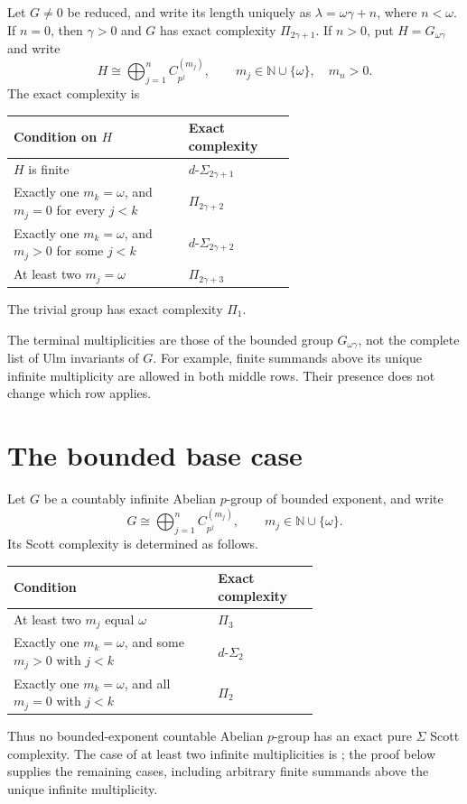 \documentclass[11pt]{article}
\begin{document}
\begin{theorem}
\label{thm:reduced-classification}
Let $G\ne0$ be reduced, and write its length uniquely as
$\lambda=\omega\gamma+n$, where $n<\omega$.
If $n=0$, then $\gamma>0$ and $G$ has exact complexity
$\Pi_{2\gamma+1}$.
If $n>0$, put $H=G_{\omega\gamma}$ and write
\[
 H\cong\bigoplus_{j=1}^{n}C_{p^j}^{(m_j)},\qquad
 m_j\in\mathbb N\cup\{\omega\},\quad m_n>0.
\]
The exact complexity is
\begin{center}
\normalfont
\begin{tabular}{@{}p{0.62\linewidth}l@{}}
\hline
Condition on $H$ & Exact complexity\\
\hline
$H$ is finite & $d\text{-}\Sigma_{2\gamma+1}$\\[4pt]
Exactly one $m_k=\omega$, and $m_j=0$ for every $j<k$
 & $\Pi_{2\gamma+2}$\\[4pt]
Exactly one $m_k=\omega$, and $m_j>0$ for some $j<k$
 & $d\text{-}\Sigma_{2\gamma+2}$\\[4pt]
At least two $m_j=\omega$ & $\Pi_{2\gamma+3}$\\
\hline
\end{tabular}
\end{center}
The trivial group has exact complexity $\Pi_1$.
\end{theorem}


The terminal multiplicities are those of the bounded group
$G_{\omega\gamma}$, not the complete list of Ulm invariants of $G$.
For example, finite summands above its unique infinite multiplicity are
allowed in both middle rows. Their presence does not change which row
applies.

\section{The bounded base case}
\begin{theorem}\label{thm:bounded-pgroup-classification}
Let $G$ be a countably infinite Abelian $p$-group of bounded exponent,
and write
\[
 G\cong\bigoplus_{j=1}^n C_{p^j}^{(m_j)},
 \qquad m_j\in\mathbb N\cup\{\omega\}.
\]
Its Scott complexity is determined as follows.
\begin{center}
\begin{tabular}{p{0.67\linewidth}|l}
Condition & Exact complexity\\ \hline
At least two $m_j$ equal $\omega$ & $\Pi_3$\\
Exactly one $m_k=\omega$, and some $m_j>0$ with $j<k$
 & $d\text{-}\Sigma_2$\\
Exactly one $m_k=\omega$, and all $m_j=0$ with $j<k$
 & $\Pi_2$
\end{tabular}
\end{center}
Thus no bounded-exponent countable Abelian $p$-group has an exact
pure $\Sigma$ Scott complexity. The case of at least two infinite
multiplicities is \cite[Theorem~4.2]{ACM}; the proof below supplies
the remaining cases, including arbitrary finite summands above the
unique infinite multiplicity.
\end{theorem}
\end{document}
